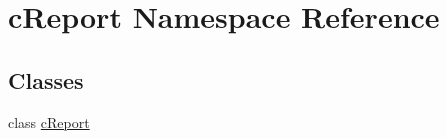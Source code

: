 \hypertarget{namespacecReport}{\section{c\-Report \-Namespace \-Reference}
\label{namespacecReport}
}
\subsection*{\-Classes}
\begin{DoxyCompactItemize}
\item 
class \hyperlink{classcReport_1_1cReport}{c\-Report}
\end{DoxyCompactItemize}
